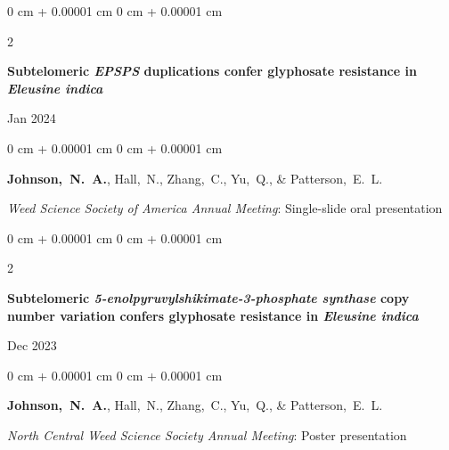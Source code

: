 \documentclass[10pt, letterpaper]{article}
\newenvironment{onecolentry}{
    \begin{adjustwidth}{
        0 cm + 0.00001 cm
    }{
        0 cm + 0.00001 cm
    }
}{
    \end{adjustwidth}
} %
\newenvironment{twocolentry}[2][]{
    \onecolentry
    \def\secondColumn{#2}
    \setcolumnwidth{\fill, 4.5 cm}
    \begin{paracol}{2}
}{
    \switchcolumn \raggedleft \secondColumn
    \end{paracol}
    \endonecolentry
} %
\begin{document}
        \vspace{0.2 cm}
        

        \begin{samepage}
            \begin{twocolentry}{
                Jan 2024
            }
                \textbf{Subtelomeric \textit{EPSPS} duplications confer glyphosate resistance in \textit{Eleusine indica}}
            \end{twocolentry}

            \vspace{0.10 cm}
            
            \begin{onecolentry}
                \mbox{\textbf{Johnson, N. A.}}, \mbox{Hall, N.}, \mbox{Zhang, C.}, \mbox{Yu, Q.}, \& \mbox{Patterson, E. L.}

                \vspace{0.10 cm}
                
                \textit{Weed Science Society of America Annual Meeting}: Single-slide oral presentation
            \end{onecolentry}
        \end{samepage}


        \vspace{0.2 cm}
        

        \begin{samepage}
            \begin{twocolentry}{
                Dec 2023
            }
                \textbf{Subtelomeric \textit{5-enolpyruvylshikimate-3-phosphate synthase} copy number variation confers glyphosate resistance in \textit{Eleusine indica}}
            \end{twocolentry}

            \vspace{0.10 cm}
            
            \begin{onecolentry}
                \mbox{\textbf{Johnson, N. A.}}, \mbox{Hall, N.}, \mbox{Zhang, C.}, \mbox{Yu, Q.}, \& \mbox{Patterson, E. L.}

                \vspace{0.10 cm}
                
                \textit{North Central Weed Science Society Annual Meeting}: Poster presentation
            \end{onecolentry}
        \end{samepage}
\end{document}
